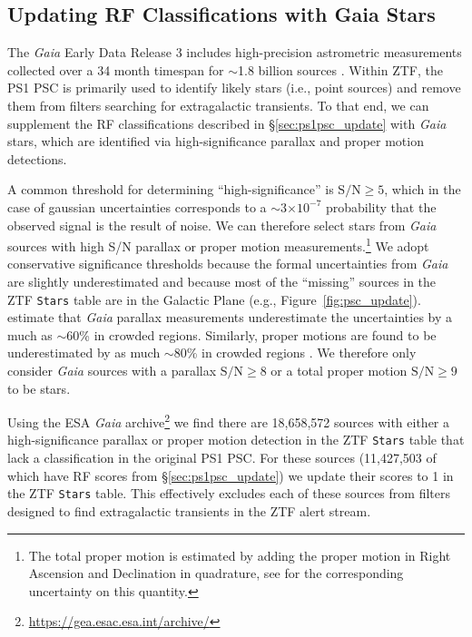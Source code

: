 \documentclass[twocolumn]{aastex63}
\begin{document}
\subsection{Updating RF Classifications with Gaia Stars}\label{sec:gaia}

The \textit{Gaia} Early Data Release 3 includes high-precision astrometric
measurements collected over a 34 month timespan for $\sim$1.8 billion sources
\citep{Gaia-Collaboration20}. Within ZTF, the PS1 PSC is primarily used to
identify likely stars (i.e., point sources) and remove them from filters
searching for extragalactic transients. To that end, we can supplement the RF
classifications described in \S\ref{sec:ps1psc_update} with \textit{Gaia}
stars, which are identified via high-significance parallax and proper motion
detections.

A common threshold for determining ``high-significance'' is $\mathrm{S/N} \ge
5$, which in the case of gaussian uncertainties corresponds to a
$\sim$3$\times 10^{-7}$ probability that the observed signal is the result of
noise. We can therefore select stars from \textit{Gaia} sources with high S/N
parallax or proper motion measurements.\footnote{The total proper motion is
estimated by adding the proper motion in Right Ascension and Declination in
quadrature, see \citet{Tachibana18} for the corresponding uncertainty on this
quantity.} We adopt conservative significance thresholds because the formal
uncertainties from \textit{Gaia} are slightly underestimated
\citep{Fabricius20} and because most of the ``missing'' sources in the ZTF
\texttt{Stars} table are in the Galactic Plane (e.g.,
Figure~\ref{fig:psc_update}). \citet{Fabricius20} estimate that \textit{Gaia}
parallax measurements underestimate the uncertainties by a much as $\sim$60\%
in crowded regions. Similarly, proper motions are found to be underestimated
by as much $\sim$80\% in crowded regions \citep{Fabricius20}. We therefore
only consider \textit{Gaia} sources with a parallax $\mathrm{S/N} \ge 8$ or a
total proper motion $\mathrm{S/N} \ge 9$ to be stars.

Using the ESA \textit{Gaia}
archive\footnote{\url{https://gea.esac.esa.int/archive/}} we find there are
18,658,572 sources with either a high-significance parallax or proper motion
detection in the ZTF \texttt{Stars} table that lack a classification in the
original PS1 PSC. For these sources (11,427,503 of which have RF scores from
\S\ref{sec:ps1psc_update}) we update their scores to 1 in the ZTF
\texttt{Stars} table. This effectively excludes each of these sources from
filters designed to find extragalactic transients in the ZTF alert stream.
\end{document}
